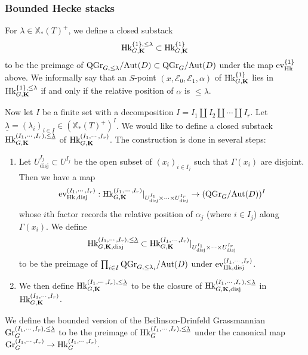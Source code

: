 \documentclass[11pt]{amsart}
\numberwithin{equation}{section}
\theoremstyle{plain}
\theoremstyle{definition}
\newcommand\cE{\mathcal{E}}
\def\bK{\mathbf{K}}
\newcommand\ev{\textup{ev}}
\newcommand{\Gr}{\textup{Gr}}
\newcommand{\Hk}{\textup{Hk}}
\newcommand\Aut{\textup{Aut}}
\newcommand\xcoch{\mathbb{X}_*}
\newcommand\un{\underline}
\newcommand\sss{\subsubsection}
\renewcommand\a\alpha
\newcommand\G\Gamma
\renewcommand{\l}{\lambda}
\newcommand{\QGr}{\mathrm{QGr}}
\newcommand{\disj}{\mathrm{disj}}
\begin{document}
\sss{Bounded Hecke stacks}\label{sss:bd Hk}
For $\l\in \xcoch(T)^{+}$, we define a closed substack
\begin{equation*}
\Hk^{\{1\}, \le \l}_{G,\bK}\subset \Hk^{\{1\}}_{G,\bK}
\end{equation*}
to be the preimage of $\QGr_{G,\le \l}/\Aut(D)\subset \QGr_{G}/\Aut(D)$ under the map $\ev^{\{1\}}_{\Hk}$ above. We informally say that an $S$-point $(x,\cE_{0},\cE_{1}, \a)$ of $\Hk^{\{1\}}_{G,\bK}$ lies in $\Hk^{\{1\}, \le \l}_{G,\bK}$ if and only if the relative position of $\a$ is $\le \l$.

Now let $I$ be a finite set with a decomposition $I=I_{1}\coprod  I_{2}\coprod \cdots\coprod  I_{r}$. Let $\un\l=(\l_{i})_{i\in I}\in (\xcoch(T)^{+})^{I}$. We would like to define a closed substack $\Hk^{(I_{1},\cdots, I_{r}), \le \un\l}_{G,\bK}$ of $\Hk^{(I_{1},\cdots, I_{r})}_{G,\bK}$. The construction is done in several steps:
\begin{enumerate}
\item Let $U^{I_{j}}_{\disj}\subset U^{I_{j}}$ be the open subset of $(x_{i})_{i\in I_{j}}$ such that $\G(x_{i})$ are disjoint. Then we have a map
\begin{equation}\label{ev disj}
\ev^{(I_{1},\cdots, I_{r})}_{\Hk,\disj}: \Hk^{(I_{1},\cdots, I_{r})}_{G,\bK}|_{U^{I_{1}}_{\disj}\times\cdots\times U^{I_{r}}_{\disj}}\to (\QGr_{G}/\Aut(D))^{I}
\end{equation}
whose $i$th factor records the relative position of $\a_{j}$ (where $i\in I_{j}$) along $\G(x_{i})$. We define 
\begin{equation*}
\Hk^{(I_{1},\cdots, I_{r}), \le \un\l}_{G,\bK, \disj}\subset \Hk^{(I_{1},\cdots, I_{r})}_{G,\bK}|_{U^{I_{1}}_{\disj}\times\cdots\times U^{I_{r}}_{\disj}}
\end{equation*}
to be the preimage of $\prod_{i\in I}\QGr_{G,\le \l_{i}}/\Aut(D)$ under $\ev^{(I_{1},\cdots, I_{r})}_{\Hk,\disj}$.


\item We then define $\Hk^{(I_{1},\cdots, I_{r}), \le \un\l}_{G,\bK}$ to be the closure of $\Hk^{(I_{1},\cdots, I_{r}), \le \un\l}_{G,\bK, \disj}$ in $\Hk^{(I_{1},\cdots, I_{r})}_{G,\bK}$. 
\end{enumerate}

We define the bounded version of the Beilinson-Drinfeld Grassmannian $\Gr^{(I_{1},\cdots, I_{r}), \le\un\l}_{G}$ to be the preimage of $\Hk^{(I_{1},\cdots, I_{r}), \le \un\l}_{G}$ under the canonical map $\Gr^{(I_{1},\cdots, I_{r})}_{G}\to \Hk^{(I_{1},\cdots, I_{r})}_{G}$.
\end{document}
